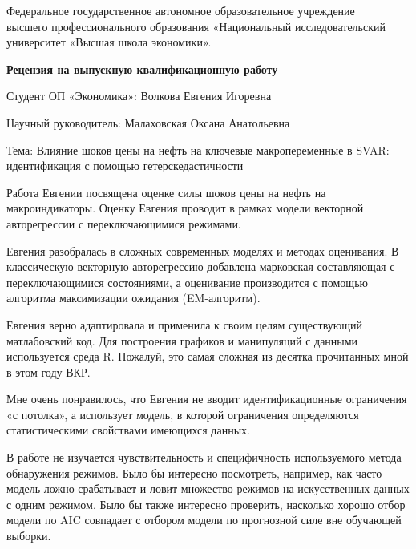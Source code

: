 \documentclass[a4paper, 12pt]{article}
\begin{document}
\begin{center}
{\small Федеральное государственное автономное образовательное учреждение\\ 
высшего профессионального образования «Национальный исследовательский\\ 
университет «Высшая школа экономики».}
\end{center}

\vspace{0.4cm}

\begin{center}
\textbf{Рецензия на выпускную квалификационную работу}
\end{center}

\vspace{0.4cm}

Студент ОП «Экономика»: Волкова Евгения Игоревна

\vspace{0.4cm}

Научный руководитель: Малаховская Оксана Анатольевна

\vspace{0.4cm}

Тема: Влияние шоков цены на нефть на ключевые макропеременные в SVAR:
идентификация с помощью гетерскедастичности

\vspace{1cm}

Работа Евгении посвящена оценке силы шоков цены на нефть на
макроиндикаторы. Оценку Евгения проводит в рамках модели векторной
авторегрессии с переключающимися режимами.

Евгения разобралась в сложных современных моделях и методах оценивания.
В классическую векторную авторегрессию добавлена марковская составляющая
с переключающимися состояниями, а оценивание производится с помощью
алгоритма максимизации ожидания (EM-алгоритм).

Евгения верно адаптировала и применила к своим целям существующий
матлабовский код. Для построения графиков и манипуляций с данными
используется среда R. Пожалуй, это самая сложная из десятка прочитанных
мной в этом году ВКР.

Мне очень понравилось, что Евгения не вводит идентификационные
ограничения «с потолка», а использует модель, в которой ограничения
определяются статистическими свойствами имеющихся данных.

В работе не изучается чувствительность и специфичность используемого
метода обнаружения режимов. Было бы интересно посмотреть, например, как
часто модель ложно срабатывает и ловит множество режимов на
искусственных данных с одним режимом. Было бы также интересно проверить,
насколько хорошо отбор модели по AIC совпадает с отбором модели по
прогнозной силе вне обучающей выборки.
\end{document}
